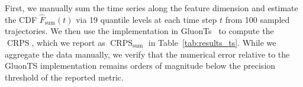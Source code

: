 First, we manually sum the time series along the feature dimension and estimate the CDF $\hat{F}_\text{sum}(t)$ via 19 quantile levels at each time step $t$ from 100 sampled trajectories. We then use the implementation in GluonTs~\cite{gluonts} to compute the $\operatorname{CRPS}$, which we report as $\operatorname{CRPS}_\text{sum}$ in Table~\ref{tab:results_ts}. While we aggregate the data manually, we verify that the numerical error relative to the GluonTS implementation remains orders of magnitude below the precision threshold of the reported metric.
